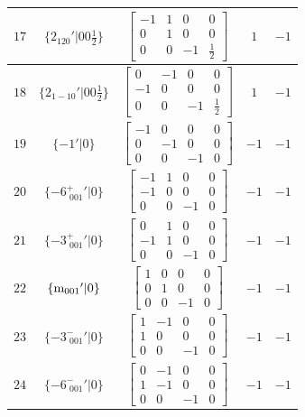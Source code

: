 \documentclass[fleqn,8pt]{jsarticle}
\begin{document}
\begin{longtable}{ccccc}
$ 17 $ & $ \{2{}_{120}{}'|0 0 \frac{1}{2}\} $ & $ \begin{bmatrix} -1 & 1 & 0 & 0 \\ 0 & 1 & 0 & 0 \\ 0 & 0 & -1 & \frac{1}{2} \end{bmatrix} $ & $ 1 $ & $ -1 $ \\ \hline
$ 18 $ & $ \{2{}_{1-10}{}'|0 0 \frac{1}{2}\} $ & $ \begin{bmatrix} 0 & -1 & 0 & 0 \\ -1 & 0 & 0 & 0 \\ 0 & 0 & -1 & \frac{1}{2} \end{bmatrix} $ & $ 1 $ & $ -1 $ \\ \hline
$ 19 $ & $ \{-1{}'|0\} $ & $ \begin{bmatrix} -1 & 0 & 0 & 0 \\ 0 & -1 & 0 & 0 \\ 0 & 0 & -1 & 0 \end{bmatrix} $ & $ -1 $ & $ -1 $ \\ \hline
$ 20 $ & $ \{-6^{+}_{\,\,001}{}'|0\} $ & $ \begin{bmatrix} -1 & 1 & 0 & 0 \\ -1 & 0 & 0 & 0 \\ 0 & 0 & -1 & 0 \end{bmatrix} $ & $ -1 $ & $ -1 $ \\ \hline
$ 21 $ & $ \{-3^{+}_{\,\,001}{}'|0\} $ & $ \begin{bmatrix} 0 & 1 & 0 & 0 \\ -1 & 1 & 0 & 0 \\ 0 & 0 & -1 & 0 \end{bmatrix} $ & $ -1 $ & $ -1 $ \\ \hline
$ 22 $ & $ \{{\rm m}_{001}{}'|0\} $ & $ \begin{bmatrix} 1 & 0 & 0 & 0 \\ 0 & 1 & 0 & 0 \\ 0 & 0 & -1 & 0 \end{bmatrix} $ & $ -1 $ & $ -1 $ \\ \hline
$ 23 $ & $ \{-3^{-}_{\,\,001}{}'|0\} $ & $ \begin{bmatrix} 1 & -1 & 0 & 0 \\ 1 & 0 & 0 & 0 \\ 0 & 0 & -1 & 0 \end{bmatrix} $ & $ -1 $ & $ -1 $ \\ \hline
$ 24 $ & $ \{-6^{-}_{\,\,001}{}'|0\} $ & $ \begin{bmatrix} 0 & -1 & 0 & 0 \\ 1 & -1 & 0 & 0 \\ 0 & 0 & -1 & 0 \end{bmatrix} $ & $ -1 $ & $ -1 $ \\
\end{longtable}
\end{document}
